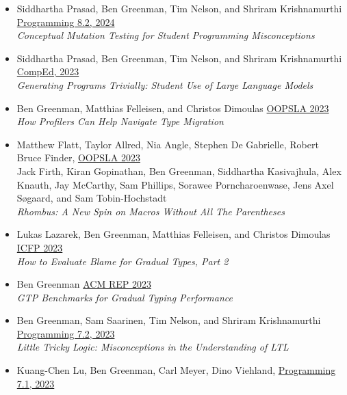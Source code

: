 \documentclass[11pt]{article}
\begin{document}
\begin{itemize}
\item
  Siddhartha Prasad, Ben Greenman, Tim Nelson, and Shriram Krishnamurthi \hfill \href{https://2023.programming-conference.org/}{Programming 8.2, 2024} \\
  \emph{Conceptual Mutation Testing for Student Programming Misconceptions}
\item
  Siddhartha Prasad, Ben Greenman, Tim Nelson, and Shriram Krishnamurthi \hfill \href{https://comped.acm.org/call-for-participation-2/}{CompEd, 2023} \\
  \emph{Generating Programs Trivially: Student Use of Large Language Models}
\item
  Ben Greenman, Matthias Felleisen, and Christos Dimoulas \hfill \href{https://2023.splashcon.org/track/splash-2023-oopsla}{OOPSLA 2023} \\
  \emph{How Profilers Can Help Navigate Type Migration}
\item
  Matthew Flatt, Taylor Allred, Nia Angle, Stephen De Gabrielle, Robert Bruce Finder, \hfill \href{https://2023.splashcon.org/track/splash-2023-oopsla}{OOPSLA 2023} \\
  Jack Firth, Kiran Gopinathan, Ben Greenman, Siddhartha Kasivajhula,
  Alex Knauth, Jay McCarthy, Sam Phillips, Sorawee Porncharoenwase, Jens Axel Søgaard, and Sam Tobin-Hochstadt \\
  \emph{Rhombus: A New Spin on Macros Without All The Parentheses}
\item
  Lukas Lazarek, Ben Greenman, Matthias Felleisen, and Christos Dimoulas \hfill \href{https://icfp23.sigplan.org/}{ICFP 2023} \\
  \emph{How to Evaluate Blame for Gradual Types, Part 2}
\item
  Ben Greenman \hfill \href{https://acm-rep.github.io/2023/}{ACM REP 2023} \\
  \emph{GTP Benchmarks for Gradual Typing Performance}
\item
  Ben Greenman, Sam Saarinen, Tim Nelson, and Shriram Krishnamurthi \hfill \href{https://2023.programming-conference.org/}{Programming 7.2, 2023} \\
  \emph{Little Tricky Logic: Misconceptions in the Understanding of LTL}
\item
  Kuang-Chen Lu, Ben Greenman, Carl Meyer, Dino Viehland, \hfill \href{https://2023.programming-conference.org/}{Programming 7.1, 2023} \\

\end{itemize}
\end{document}
